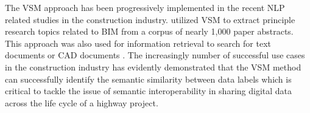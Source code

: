 \documentclass[Journal,InsideFigs, DoubleSpace]{ascelike} %
\begin{document}
\par
The VSM approach has been progressively implemented in the recent NLP related studies in the construction industry.  utilized VSM to extract principle research topics related to BIM from a corpus of nearly 1,000 paper abstracts. This approach was also used for information retrieval to search for text documents \cite{lv15} or CAD documents \cite{hsu13}. The increasingly number of successful use cases in the construction industry has evidently demonstrated that the VSM method can successfully identify the semantic similarity between data labels which is critical to tackle the issue of semantic interoperability in sharing digital data across the life cycle of a highway project.
%
\end{document}
